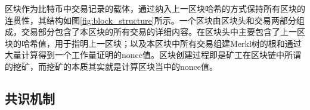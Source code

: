 区块作为比特币中交易记录的载体，通过纳入上一区块哈希的方式保持所有区块的连贯性，其结构如图\ref{fig:block_structure}所示。一个区块由区块头和交易两部分组成，交易部分包含了本区块的所有交易的详细内容。在区块头中主要包含了上一区块的哈希值，用于指明上一区块；以及本区块中所有交易组建Merkl树的根和通过大量计算得到一个工作量证明的nonce值。区块创建过程即是矿工在区块链中所谓的挖矿，而挖矿的本质其实就是计算区块当中的nonce值。


















\subsection{共识机制}

